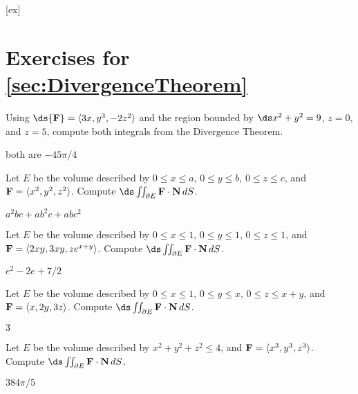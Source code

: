[ex]
\section*{Exercises for \ref{sec:DivergenceTheorem}}

\begin{enumialphparenastyle}

\begin{ex}
Using $\ds{\bf F}=\langle 3x,y^3,-2z^2\rangle$ and the
region bounded by $\ds x^2+y^2=9$, $z=0$, and $z=5$, compute both
integrals from the Divergence Theorem.
\begin{sol}
	both are $-45\pi/4$
\end{sol}
\end{ex}

\begin{ex}
Let $E$ be the volume described by 
$0\le x\le a$, $0\le y\le b$, $0\le z\le c$, and 
${\bf F}= \langle x^2,y^2,z^2\rangle$. Compute
$\ds\iint_{\partial E} {\bf F}\cdot {\bf N}\,dS$.
\begin{sol}
	$a^2bc+ab^2c+abc^2$
\end{sol}
\end{ex}

\begin{ex}
Let $E$ be the volume described by 
$0\le x\le 1$, $0\le y\le 1$, $0\le z\le 1$, and 
${\bf F}= \langle 2xy,3xy,ze^{x+y}\rangle$. Compute
$\ds\iint_{\partial E} {\bf F}\cdot {\bf N}\,dS$.
\begin{sol}
	$e^2-2e+7/2$
\end{sol}
\end{ex}

\begin{ex}
Let $E$ be the volume described by 
$0\le x\le 1$, $0\le y\le x$, $0\le z\le x+y$, and 
${\bf F}= \langle x,2y,3z\rangle$. Compute
$\ds\iint_{\partial E} {\bf F}\cdot {\bf N}\,dS$.
\begin{sol}
	$3$
\end{sol}
\end{ex}

\begin{ex}
Let $E$ be the volume described by 
$x^2+y^2+z^2\le 4$, and 
${\bf F}= \langle x^3,y^3,z^3\rangle$. Compute
$\ds\iint_{\partial E} {\bf F}\cdot {\bf N}\,dS$.
\begin{sol}
	$384\pi/5$
\end{sol}
\end{ex}


\end{enumialphparenastyle}
